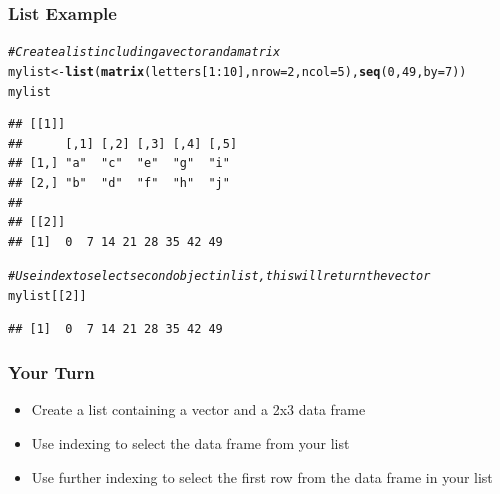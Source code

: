 \documentclass{beamer}\usepackage[]{graphicx}\usepackage[]{color}
\makeatletter
\newcommand{\hlnum}[1]{\textcolor[rgb]{0.686,0.059,0.569}{#1}}%
\newcommand{\hlcom}[1]{\textcolor[rgb]{0.678,0.584,0.686}{\textit{#1}}}%
\newcommand{\hlopt}[1]{\textcolor[rgb]{0,0,0}{#1}}%
\newcommand{\hlstd}[1]{\textcolor[rgb]{0.345,0.345,0.345}{#1}}%
\newcommand{\hlkwb}[1]{\textcolor[rgb]{0.69,0.353,0.396}{#1}}%
\newcommand{\hlkwc}[1]{\textcolor[rgb]{0.333,0.667,0.333}{#1}}%
\newcommand{\hlkwd}[1]{\textcolor[rgb]{0.737,0.353,0.396}{\textbf{#1}}}%
\newenvironment{kframe}{%
 \def\at@end@of@kframe{}%
 \ifinner\ifhmode%
  \def\at@end@of@kframe{\end{minipage}}%
  \begin{minipage}{\columnwidth}%
 \fi\fi%
 \def\FrameCommand##1{\hskip\@totalleftmargin \hskip-\fboxsep
 \colorbox{shadecolor}{##1}\hskip-\fboxsep
     \hskip-\linewidth \hskip-\@totalleftmargin \hskip\columnwidth}%
 \MakeFramed {\advance\hsize-\width
   \@totalleftmargin\z@ \linewidth\hsize
   \@setminipage}}%
 {\par\unskip\endMakeFramed%
 \at@end@of@kframe}
\newenvironment{knitrout}{}{} %
\makeatother
\begin{document}
\begin{frame}[fragile]
    \frametitle{List Example}
    \small
\begin{knitrout}\footnotesize
{}\color{fgcolor}\begin{kframe}
\begin{alltt}
\hlcom{# Create a list including a vector and a matrix}
\hlstd{mylist} \hlkwb{<-} \hlkwd{list}\hlstd{(}\hlkwd{matrix}\hlstd{(letters[}\hlnum{1}\hlopt{:}\hlnum{10}\hlstd{],} \hlkwc{nrow} \hlstd{=} \hlnum{2}\hlstd{,} \hlkwc{ncol} \hlstd{=} \hlnum{5}\hlstd{),} \hlkwd{seq}\hlstd{(}\hlnum{0}\hlstd{,} \hlnum{49}\hlstd{,} \hlkwc{by} \hlstd{=} \hlnum{7}\hlstd{))}
\hlstd{mylist}
\end{alltt}
\begin{verbatim}
## [[1]]
##      [,1] [,2] [,3] [,4] [,5]
## [1,] "a"  "c"  "e"  "g"  "i" 
## [2,] "b"  "d"  "f"  "h"  "j" 
## 
## [[2]]
## [1]  0  7 14 21 28 35 42 49
\end{verbatim}
\begin{alltt}
\hlcom{# Use index to select second object in list, this will return the vector}
\hlstd{mylist[[}\hlnum{2}\hlstd{]]}
\end{alltt}
\begin{verbatim}
## [1]  0  7 14 21 28 35 42 49
\end{verbatim}
\end{kframe}
\end{knitrout}

    \normalsize
\end{frame}


\begin{frame}
    \frametitle{Your Turn}
    \begin{itemize}
        \item Create a list containing a vector and a 2x3 data frame
        \item Use indexing to select the data frame from your list
        \item Use further indexing to select the first row from the data frame in your list
    \end{itemize}    
\end{frame}

\end{document}
